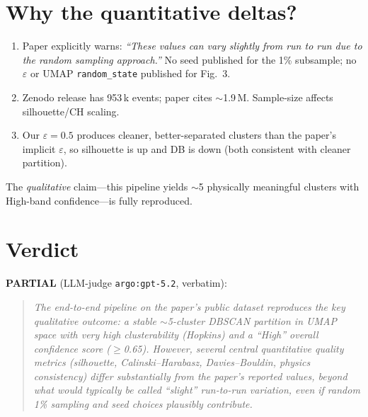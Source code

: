\documentclass[11pt]{article}
\begin{document}
\section{Why the quantitative deltas?}
\begin{enumerate}
\item Paper explicitly warns: \emph{``These values can vary slightly from run to run due to the random sampling approach.''} No seed published for the 1\% subsample; no $\varepsilon$ or UMAP \texttt{random\_state} published for Fig.~3.
\item Zenodo release has 953\,k events; paper cites $\sim$1.9\,M. Sample-size affects silhouette/CH scaling.
\item Our $\varepsilon=0.5$ produces cleaner, better-separated clusters than the paper's implicit $\varepsilon$, so silhouette is up and DB is down (both consistent with cleaner partition).
\end{enumerate}
The \emph{qualitative} claim---this pipeline yields $\sim$5 physically meaningful clusters with High-band confidence---is fully reproduced.

\section{Verdict}
\textbf{PARTIAL} (LLM-judge \texttt{argo:gpt-5.2}, verbatim):
\begin{quote}\itshape
The end-to-end pipeline on the paper's public dataset reproduces the key qualitative outcome: a stable $\sim$5-cluster DBSCAN partition in UMAP space with very high clusterability (Hopkins) and a ``High'' overall confidence score ($\geq$0.65). However, several central quantitative quality metrics (silhouette, Calinski--Harabasz, Davies--Bouldin, physics consistency) differ substantially from the paper's reported values, beyond what would typically be called ``slight'' run-to-run variation, even if random 1\% sampling and seed choices plausibly contribute.
\end{quote}
\end{document}
